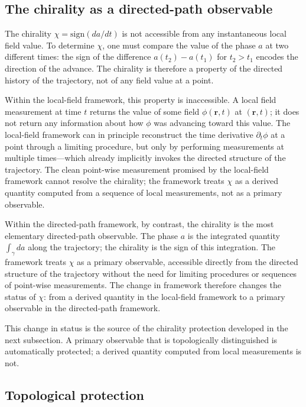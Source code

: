 \documentclass[%
 reprint, amsmath,amssymb, aps, prb, ]{revtex4-2}
\numberwithin{equation}{section}
\begin{document}
\subsection{The chirality as a directed-path observable}
\label{sec:chirality_directed_path}

The chirality $\chi = \mathrm{sign}(da/dt)$ is not accessible from any instantaneous local field value. To determine $\chi$, one must compare the value of the phase $a$ at two different times: the sign of the difference $a(t_2) - a(t_1)$ for $t_2 > t_1$ encodes the direction of the advance. The chirality is therefore a property of the directed history of the trajectory, not of any field value at a point.

Within the local-field framework, this property is inaccessible. A local field measurement at time $t$ returns the value of some field $\phi(\mathbf{r}, t)$ at $(\mathbf{r}, t)$; it does not return any information about how $\phi$ was advancing toward this value. The local-field framework can in principle reconstruct the time derivative $\partial_t \phi$ at a point through a limiting procedure, but only by performing measurements at multiple times---which already implicitly invokes the directed structure of the trajectory. The clean point-wise measurement promised by the local-field framework cannot resolve the chirality; the framework treats $\chi$ as a derived quantity computed from a sequence of local measurements, not as a primary observable.

Within the directed-path framework, by contrast, the chirality is the most elementary directed-path observable. The phase $a$ is the integrated quantity $\int_\gamma da$ along the trajectory; the chirality is the sign of this integration. The framework treats $\chi$ as a primary observable, accessible directly from the directed structure of the trajectory without the need for limiting procedures or sequences of point-wise measurements. The change in framework therefore changes the status of $\chi$: from a derived quantity in the local-field framework to a primary observable in the directed-path framework.

This change in status is the source of the chirality protection developed in the next subsection. A primary observable that is topologically distinguished is automatically protected; a derived quantity computed from local measurements is not.

\subsection{Topological protection}
\label{sec:topological_protection}
\end{document}
